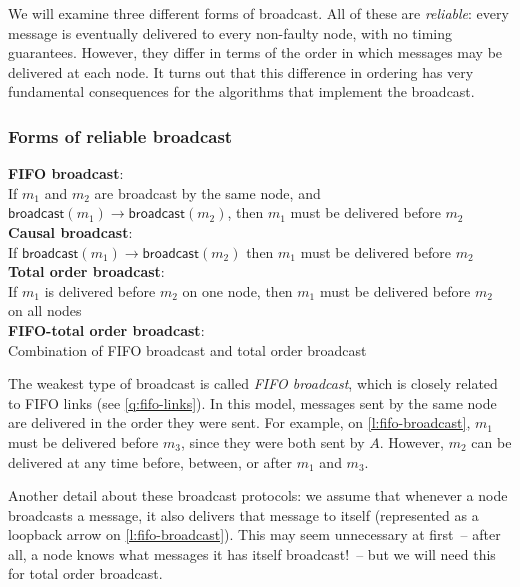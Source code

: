 We will examine three different forms of broadcast.
All of these are \emph{reliable}: every message is eventually delivered to every non-faulty node, with no timing guarantees.
However, they differ in terms of the order in which messages may be delivered at each node.
It turns out that this difference in ordering has very fundamental consequences for the algorithms that implement the broadcast.

\begin{frame}
    \label{s:broadcast-order}
    \frametitle{Forms of reliable broadcast}
    \textbf{FIFO broadcast}:\\
    If $m_1$ and $m_2$ are broadcast by the same node, and $\mathsf{broadcast}(m_1) \rightarrow \mathsf{broadcast}(m_2)$, then $m_1$ must be delivered before $m_2$\\[1em]\pause
    \textbf{Causal broadcast}:\\
    If $\mathsf{broadcast}(m_1) \rightarrow \mathsf{broadcast}(m_2)$ then $m_1$ must be delivered before $m_2$\\[1em]\pause
    \textbf{Total order broadcast}:\\
    If $m_1$ is delivered before $m_2$ on one node, then $m_1$ must be delivered before $m_2$ on all nodes\\[1em]\pause
    \textbf{FIFO-total order broadcast}:\\
    Combination of FIFO broadcast and total order broadcast
\end{frame}
\label{l:broadcast-order}

The weakest type of broadcast is called \emph{FIFO broadcast}, which is closely related to FIFO links (see \autoref{q:fifo-links}).
In this model, messages sent by the same node are delivered in the order they were sent.
For example, on \autoref{l:fifo-broadcast}, $m_1$ must be delivered before $m_3$, since they were both sent by $A$.
However, $m_2$ can be delivered at any time before, between, or after $m_1$ and $m_3$.

Another detail about these broadcast protocols: we assume that whenever a node broadcasts a message, it also delivers that message to itself (represented as a loopback arrow on \autoref{l:fifo-broadcast}).
This may seem unnecessary at first~-- after all, a node knows what messages it has itself broadcast!~-- but we will need this for total order broadcast.

